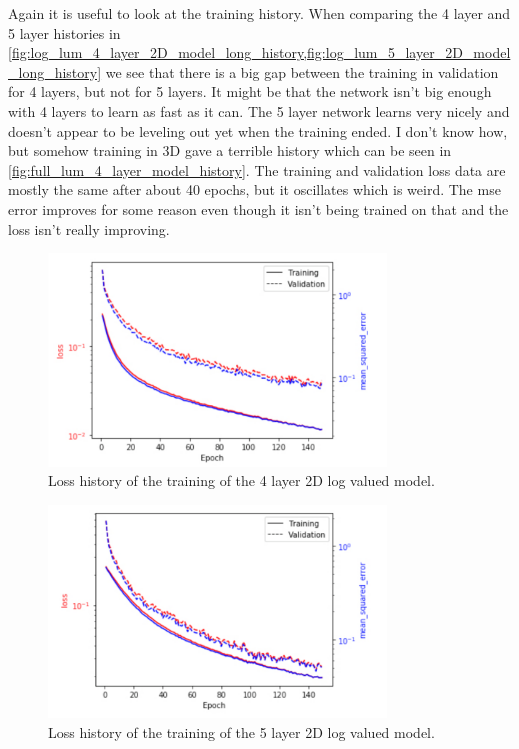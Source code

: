 \documentclass{article}
\begin{document}
			Again it is useful to look at the training history.  When comparing the 4 layer and 5 layer histories in \cref{fig:log_lum_4_layer_2D_model_long_history,fig:log_lum_5_layer_2D_model_long_history} we see that there is a big gap between the training in validation for 4 layers, but not for 5 layers.  It might be that the network isn't big enough with 4 layers to learn as fast as it can.  The 5 layer network learns very nicely and doesn't appear to be leveling out yet when the training ended.  I don't know how, but somehow training in 3D gave a terrible history which can be seen in \cref{fig:full_lum_4_layer_model_history}.  The training and validation loss data are mostly the same after about 40 epochs, but it oscillates which is weird.  The mse error improves for some reason even though it isn't being trained on that and the loss isn't really improving.

			\begin{figure}[H]
				\centering
				\includegraphics[width=0.8\textwidth]{log_lum_4_layer_2D_model_long_history.pdf}
				\caption{Loss history of the training of the 4 layer 2D log valued model.}
				\label{fig:log_lum_4_layer_2D_model_long_history}
			\end{figure}

			\begin{figure}[H]
				\centering
				\includegraphics[width=0.8\textwidth]{log_lum_5_layer_2D_model_long_history.pdf}
				\caption{Loss history of the training of the 5 layer 2D log valued model.}
				\label{fig:log_lum_5_layer_2D_model_long_history}
			\end{figure}
\end{document}
